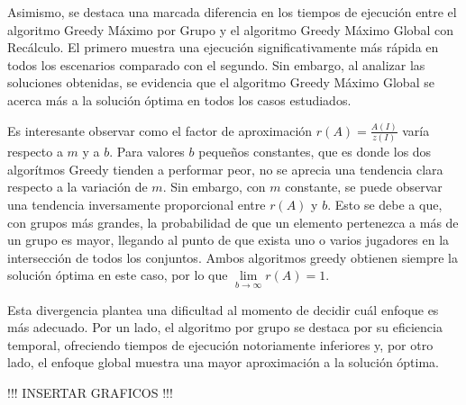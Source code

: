 Asimismo, se destaca una marcada diferencia en los tiempos de ejecución entre el algoritmo Greedy Máximo por Grupo y el algoritmo Greedy Máximo Global con Recálculo. El primero muestra una ejecución significativamente más rápida en todos los escenarios comparado con el segundo. Sin embargo, al analizar las soluciones obtenidas, se evidencia que el algoritmo Greedy Máximo Global se acerca más a la solución óptima en todos los casos estudiados.

Es interesante observar como el factor de aproximación $r(A)=\frac{A(I)}{z(I)}$ varía respecto a $m$ y a $b$. Para valores $b$ pequeños constantes, que es donde los dos algorítmos Greedy tienden a performar peor, no se aprecia una tendencia clara respecto a la variación de $m$. Sin embargo, con $m$ constante, se puede observar una tendencia inversamente proporcional entre $r(A)$ y $b$. Esto se debe a que, con grupos más grandes, la probabilidad de que un elemento pertenezca a más de un grupo es mayor, llegando al punto de que exista uno o varios jugadores en la intersección de todos los conjuntos. Ambos algoritmos greedy obtienen siempre la solución óptima en este caso, por lo que $\lim\limits_{b \rightarrow \infty}r(A)=1$.

Esta divergencia plantea una dificultad al momento de decidir cuál enfoque es más adecuado. Por un lado, el algoritmo por grupo se destaca por su eficiencia temporal, ofreciendo tiempos de ejecución notoriamente inferiores y, por otro lado, el enfoque global muestra una mayor aproximación a la solución óptima.

!!! INSERTAR GRAFICOS !!!


